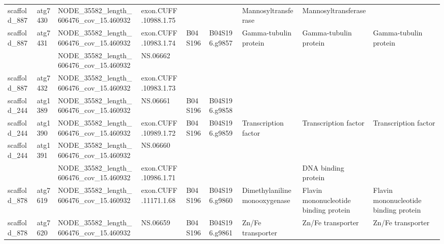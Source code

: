 \begin{longtable}{lllllllll}
   scaffold\_887 &       atg7430 &  NODE\_35582\_length\_606476\_cov\_15.460932 &  exon.CUFF.10988.1.75 &              &                &                              Mannosyltransferase &                              Mannosyltransferase &                                                \\
   scaffold\_887 &       atg7431 &  NODE\_35582\_length\_606476\_cov\_15.460932 &  exon.CUFF.10983.1.74 &      B04S196 &  B04S196.g9857 &                            Gamma-tubulin protein &                            Gamma-tubulin protein &                          Gamma-tubulin protein \\
                &               &  NODE\_35582\_length\_606476\_cov\_15.460932 &              NS.06662 &              &                &                                                  &                                                  &                                                \\
   scaffold\_887 &       atg7432 &  NODE\_35582\_length\_606476\_cov\_15.460932 &  exon.CUFF.10983.1.73 &              &                &                                                  &                                                  &                                                \\
   scaffold\_244 &       atg1389 &  NODE\_35582\_length\_606476\_cov\_15.460932 &              NS.06661 &      B04S196 &  B04S196.g9858 &                                                  &                                                  &                                                \\
   scaffold\_244 &       atg1390 &  NODE\_35582\_length\_606476\_cov\_15.460932 &  exon.CUFF.10989.1.72 &      B04S196 &  B04S196.g9859 &                             Transcription factor &                             Transcription factor &                           Transcription factor \\
   scaffold\_244 &       atg1391 &  NODE\_35582\_length\_606476\_cov\_15.460932 &              NS.06660 &              &                &                                                  &                                                  &                                                \\
                &               &  NODE\_35582\_length\_606476\_cov\_15.460932 &  exon.CUFF.10986.1.71 &              &                &                                                  &                              DNA binding protein &                                                \\
   scaffold\_878 &       atg7619 &  NODE\_35582\_length\_606476\_cov\_15.460932 &  exon.CUFF.11171.1.68 &      B04S196 &  B04S196.g9860 &                    Dimethylaniline monooxygenase &            Flavin mononucleotide binding protein &          Flavin mononucleotide binding protein \\
   scaffold\_878 &       atg7620 &  NODE\_35582\_length\_606476\_cov\_15.460932 &              NS.06659 &      B04S196 &  B04S196.g9861 &                                Zn/Fe transporter &                                Zn/Fe transporter &                              Zn/Fe transporter \\
\end{longtable}
